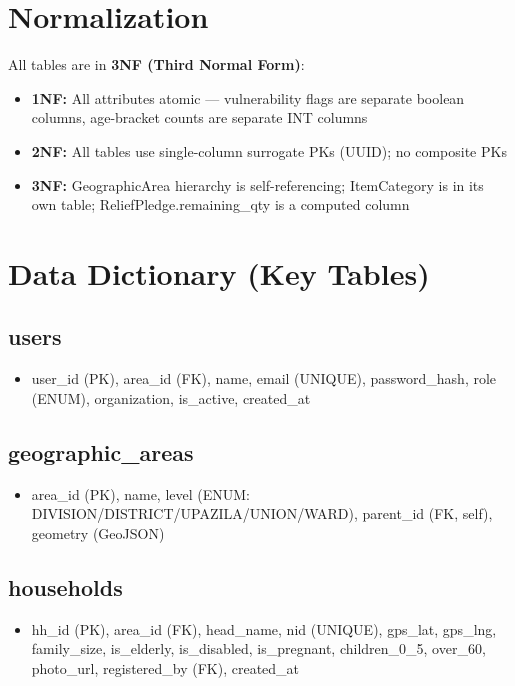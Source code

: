 \section{Normalization}
All tables are in \textbf{3NF (Third Normal Form)}:

\begin{itemize}[nosep]
    \item \textbf{1NF:} All attributes atomic --- vulnerability flags are separate boolean columns, age-bracket counts are separate INT columns
    \item \textbf{2NF:} All tables use single-column surrogate PKs (UUID); no composite PKs
    \item \textbf{3NF:} GeographicArea hierarchy is self-referencing; ItemCategory is in its own table; ReliefPledge.remaining\_qty is a computed column
\end{itemize}

\section{Data Dictionary (Key Tables)}

\subsection{users}
\begin{itemize}[nosep]
    \item user\_id (PK), area\_id (FK), name, email (UNIQUE), password\_hash, role (ENUM), organization, is\_active, created\_at
\end{itemize}

\subsection{geographic\_areas}
\begin{itemize}[nosep]
    \item area\_id (PK), name, level (ENUM: DIVISION/DISTRICT/UPAZILA/UNION/WARD), parent\_id (FK, self), geometry (GeoJSON)
\end{itemize}

\subsection{households}
\begin{itemize}[nosep]
    \item hh\_id (PK), area\_id (FK), head\_name, nid (UNIQUE), gps\_lat, gps\_lng, family\_size, is\_elderly, is\_disabled, is\_pregnant, children\_0\_5, over\_60, photo\_url, registered\_by (FK), created\_at
\end{itemize}

